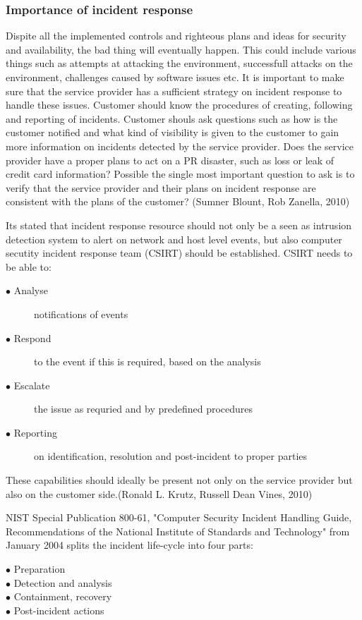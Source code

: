 \documentclass{article}
\begin{document}
\subsubsection{Importance of incident response}
Dispite all the implemented controls and righteous plans and ideas for security and availability, the bad thing will eventually happen. This could include various things such as attempts at attacking the environment, successfull attacks on the environment, challenges caused by software issues etc. It is important to make sure that the service provider has a sufficient strategy on incident response to handle these issues. Customer should know the procedures of creating, following and reporting of incidents. Customer shouls ask questions such as how is the customer notified and what kind of visibility is given to the customer to gain more information on incidents detected by the service provider. Does the service provider have a proper plans to act on a PR disaster, such as loss or leak of credit card information? Possible the single most important question to ask is to verify that the service provider and their plans on incident response are consistent with the plans of the customer? (Sumner Blount, Rob Zanella, 2010)
\par
Its stated that incident response resource should not only be a seen as intrusion detection system to alert on network and host level events, but also computer secutity incident response team (CSIRT) should be established. CSIRT needs to be able to:
\begin{description}
	\item[$\bullet$ Analyse] notifications of events
	\item[$\bullet$ Respond] to the event if this is required, based on the analysis
	\item[$\bullet$ Escalate] the issue as requried and by predefined procedures
	\item[$\bullet$ Reporting] on identification, resolution and post-incident to proper parties
\end{description}
These capabilities should ideally be present not only on the service provider but also on the customer side.(Ronald L. Krutz, Russell Dean Vines, 2010)
\par
NIST Special Publication 800-61, "Computer Security Incident Handling Guide, Recommendations of the National Institute of Standards and Technology" from January 2004 splits the incident life-cycle into four parts:
\begin{description}
	\item[$\bullet$ Preparation]
	\item[$\bullet$ Detection and analysis]
	\item[$\bullet$ Containment, recovery]
	\item[$\bullet$ Post-incident actions]
\end{description}
\end{document}
